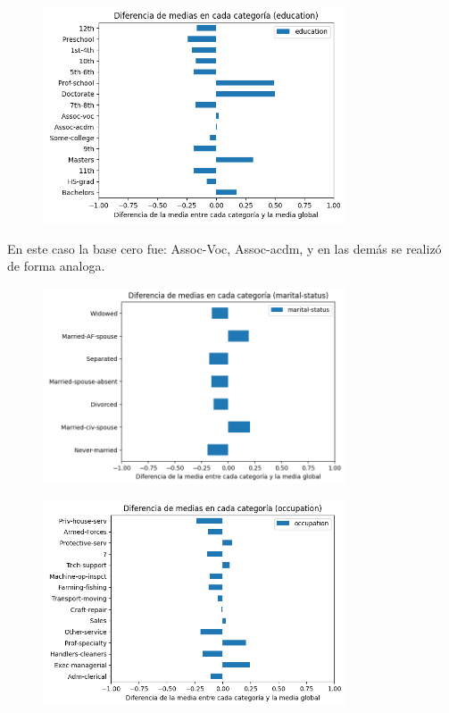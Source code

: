 \documentclass{article}
\begin{document}
	\begin{figure}[H]
		\centering
		\includegraphics[width=0.8\textwidth]{media_education.png}
	\end{figure}
	En este caso la base cero fue: Assoc-Voc, Assoc-acdm, y en las demás se realizó de forma analoga.
	\begin{figure}[H]
		\centering
		\includegraphics[width=0.8\textwidth]{media_marital.png}
	\end{figure}
	
	\begin{figure}[H]
		\centering
		\includegraphics[width=0.8\textwidth]{media_ocupation.png}
	\end{figure}
	
\end{document}
